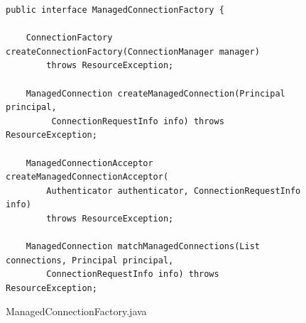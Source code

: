 
\begin{figure}[!tbp]
\centering
\lstset{language=Java, stepnumber=1, showspaces=false, showstringspaces=false,breaklines=true}
\begin{lstlisting}
public interface ManagedConnectionFactory {

    ConnectionFactory createConnectionFactory(ConnectionManager manager) 
        throws ResourceException;

    ManagedConnection createManagedConnection(Principal principal, 
         ConnectionRequestInfo info) throws ResourceException;

    ManagedConnectionAcceptor createManagedConnectionAcceptor(
        Authenticator authenticator, ConnectionRequestInfo info) 
        throws ResourceException;

    ManagedConnection matchManagedConnections(List connections, Principal principal,
        ConnectionRequestInfo info) throws ResourceException;

\end{lstlisting}
\caption{ManagedConnectionFactory.java}
\label{}
\end{figure}


